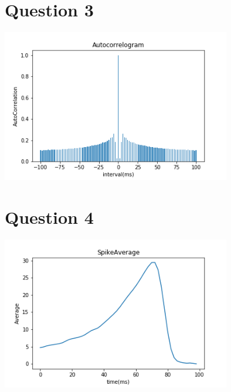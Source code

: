\documentclass[fleqn,11pt]{article}
\begin{document}
\section*{Question 3}
    \begin{center} 
        \includegraphics[width=10cm]{graphs/Autocorrelogram.png}
    \end{center}
\section*{Question 4}
\begin{center} 
    \includegraphics[width=10cm]{graphs/SpikeAverage.png}
\end{center}
\end{document}
